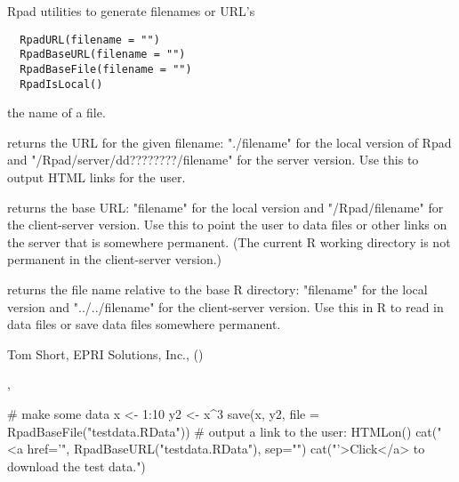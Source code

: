 \begin{Description}\relax
Rpad utilities to generate filenames or URL's
\end{Description}
\begin{Usage}
\begin{verbatim}
  RpadURL(filename = "")
  RpadBaseURL(filename = "")
  RpadBaseFile(filename = "")
  RpadIsLocal()
\end{verbatim}
\end{Usage}
\begin{Arguments}
\begin{ldescription}
\item[\code{filename}] the name of a file. 
\end{ldescription}
\end{Arguments}
\begin{Value}
 returns the URL for the given filename: "./filename" for
the local version of Rpad and "/Rpad/server/dd????????/filename" for
the server version. Use this to output HTML links for the user.

 returns the base URL: "filename" for the local
version and "/Rpad/filename" for the client-server version. Use this
to point the user to data files or other links on the server that is
somewhere permanent. (The current R working directory is not
permanent in the client-server version.)

 returns the file name relative to the base R
directory: "filename" for the local version and "../../filename" for
the client-server version. Use this in R to read in data files or save
data files somewhere permanent.
\end{Value}
\begin{Author}\relax
Tom Short, EPRI Solutions, Inc., ()
\end{Author}
\begin{SeeAlso}\relax
{}, 
\end{SeeAlso}
\begin{Examples}
\begin{ExampleCode}
  # make some data
  x <- 1:10
  y2 <- x^3
  save(x, y2, file = RpadBaseFile("testdata.RData"))
  # output a link to the user:
  HTMLon()
  cat("<a href='", RpadBaseURL("testdata.RData"), sep="")
  cat("'>Click</a> to download the test data.")
\end{ExampleCode}
\end{Examples}

